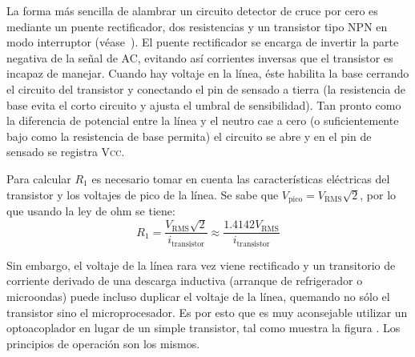 La forma más sencilla de alambrar un circuito detector de cruce por cero es mediante un puente rectificador, dos resistencias y un transistor tipo NPN en modo interruptor (véase~).
El puente rectificador se encarga de invertir la parte negativa de la señal de AC, evitando así corrientes inversas que el transistor es incapaz de manejar.
Cuando hay voltaje en la línea, éste habilita la base cerrando el circuito del transistor y conectando el pin de sensado a tierra (la resistencia de base evita el corto circuito y ajusta el umbral de sensibilidad).
Tan pronto como la diferencia de potencial entre la línea y el neutro cae a cero (o suficientemente bajo como la resistencia de base permita) el circuito se abre y en el pin de sensado se registra \textsc{Vcc}.

Para calcular $R_1$ es necesario tomar en cuenta las características eléctricas del transistor y los voltajes de pico de la línea.
Se sabe que $V_\text{pico}=V_\text{RMS}\sqrt{2}$, por lo que usando la ley de ohm se tiene:
\begin{equation}
	R_1 = \frac{V_\text{RMS}\sqrt{2}}{i_\text{transistor}} \approx
	\frac{1.4142V_\text{RMS}}{i_\text{transistor}}
\end{equation}

Sin embargo, el voltaje de la línea rara vez viene rectificado y un transitorio de corriente derivado de una descarga inductiva (arranque de refrigerador o microondas) puede incluso duplicar el voltaje de la línea, quemando no sólo el transistor sino el microprocesador.
Es por esto que es muy aconsejable utilizar un optoacoplador en lugar de un simple transistor, tal como muestra la figura .
Los principios de operación son los mismos.
